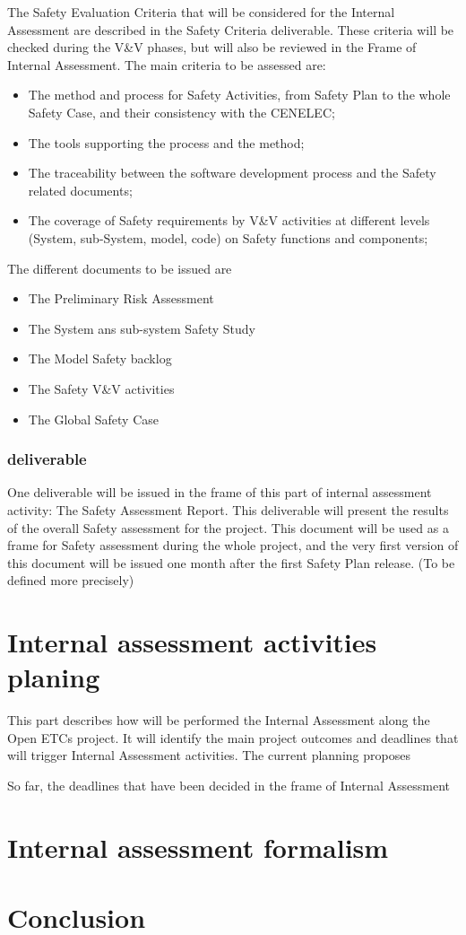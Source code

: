 \documentclass{template/openetcs_report}
\begin{document}
The Safety Evaluation Criteria that will be considered for the Internal Assessment are described in the Safety Criteria deliverable. These criteria will be checked during the V\&V phases, but will also be reviewed in the Frame of Internal Assessment.
The main criteria to be assessed are:
\begin{itemize}
\item The method and process for Safety Activities, from Safety Plan to the whole Safety Case, and their consistency with the CENELEC;
\item The tools supporting the process and the method;
\item The traceability between the software development process and the Safety related documents;
\item The coverage of Safety requirements by V\&V activities at different levels (System,  sub-System, model, code) on Safety functions and components;
\end{itemize}

The different documents to be issued are
\begin{itemize}
\item The Preliminary Risk Assessment
\item The System ans sub-system Safety Study
\item The Model Safety backlog
\item The Safety V\&V activities
\item The Global Safety Case
\end{itemize}

\subsection{deliverable}
One deliverable will be issued in the frame of this part of internal assessment activity: The Safety Assessment Report. This deliverable will present the results of the overall Safety assessment for the project.
This document will be used as a frame for Safety assessment during the whole project, and the very first version of this document will be issued one month after the first Safety Plan release. (To be defined more precisely)

\chapter{Internal assessment activities planing}
This part describes how will be performed the Internal Assessment along the Open ETCs project. It will identify the main project outcomes and deadlines that will trigger Internal Assessment activities.
The current planning proposes


So far, the deadlines that have been decided in the frame of Internal Assessment

\chapter{Internal assessment formalism}

\chapter{Conclusion}




\end{document}
